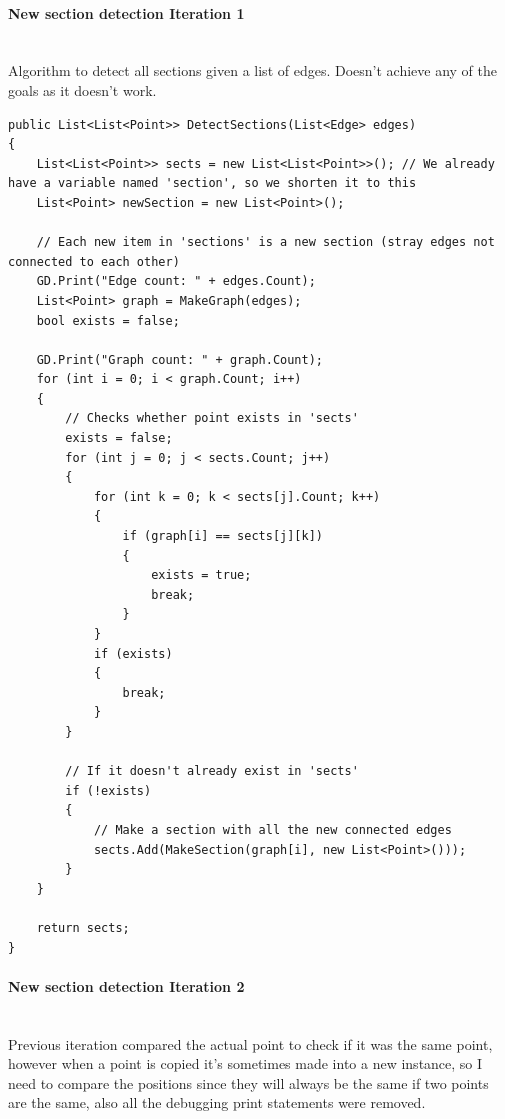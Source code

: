 \documentclass{article}
\newcommand{\parBr}{\vspace{5mm}}%
\newcommand{\myparagraph}[1]{\paragraph{#1}\mbox{}\\} %
\begin{document}
\myparagraph{New section detection Iteration 1}
Algorithm to detect all sections given a list of edges. Doesn't achieve any of the goals as it doesn't work.
\begin{lstlisting}
public List<List<Point>> DetectSections(List<Edge> edges)
{
    List<List<Point>> sects = new List<List<Point>>(); // We already have a variable named 'section', so we shorten it to this
    List<Point> newSection = new List<Point>();

    // Each new item in 'sections' is a new section (stray edges not connected to each other)
    GD.Print("Edge count: " + edges.Count);
    List<Point> graph = MakeGraph(edges);
    bool exists = false;

    GD.Print("Graph count: " + graph.Count);
    for (int i = 0; i < graph.Count; i++)
    {
        // Checks whether point exists in 'sects'
        exists = false;
        for (int j = 0; j < sects.Count; j++)
        {
            for (int k = 0; k < sects[j].Count; k++)
            {
                if (graph[i] == sects[j][k])
                {
                    exists = true;
                    break;
                }
            }
            if (exists)
            {
                break;
            }
        }

        // If it doesn't already exist in 'sects'
        if (!exists)
        {
            // Make a section with all the new connected edges
            sects.Add(MakeSection(graph[i], new List<Point>()));
        }
    }

    return sects;
}
\end{lstlisting}

\myparagraph{New section detection Iteration 2}
Previous iteration compared the actual point to check if it was the same point, however when a point is copied it's sometimes made into a new instance, so I need to compare the positions since they will always be the same if two points are the same, also all the debugging print statements were removed.

\parBr
\end{document}
